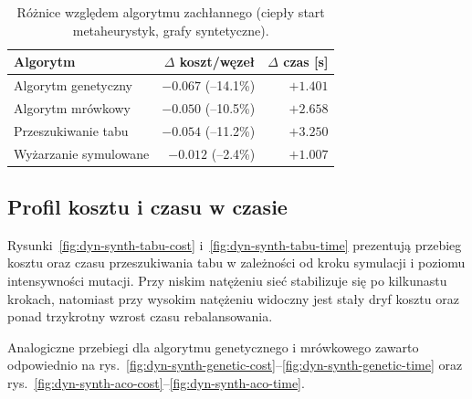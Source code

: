 \begin{table}[H]
  \centering
  \caption{Różnice względem algorytmu zachłannego (ciepły start metaheurystyk, grafy syntetyczne).}
  \label{tab:dyn-synth-delta}
  \begin{tabular}{lrr}
    \toprule
    \textbf{Algorytm}     & \textbf{$\Delta$ koszt/węzeł} & \textbf{$\Delta$ czas [s]} \\
    \midrule
    Algorytm genetyczny   & $-0.067$ (–14.1\%)            & $+1.401$                   \\
    Algorytm mrówkowy     & $-0.050$ (–10.5\%)            & $+2.658$                   \\
    Przeszukiwanie tabu   & $-0.054$ (–11.2\%)            & $+3.250$                   \\
    Wyżarzanie symulowane & $-0.012$ (–2.4\%)             & $+1.007$                   \\
  \end{tabular}
\end{table}

\subsection{Profil kosztu i czasu w czasie}

Rysunki~\ref{fig:dyn-synth-tabu-cost} i~\ref{fig:dyn-synth-tabu-time} prezentują przebieg kosztu oraz czasu przeszukiwania tabu w zależności od kroku symulacji i poziomu intensywności mutacji. Przy niskim natężeniu sieć stabilizuje się po kilkunastu krokach, natomiast przy wysokim natężeniu widoczny jest stały dryf kosztu oraz ponad trzykrotny wzrost czasu rebalansowania.

Analogiczne przebiegi dla algorytmu genetycznego i mrówkowego zawarto odpowiednio na rys.~\ref{fig:dyn-synth-genetic-cost}--\ref{fig:dyn-synth-genetic-time} oraz rys.~\ref{fig:dyn-synth-aco-cost}--\ref{fig:dyn-synth-aco-time}.

